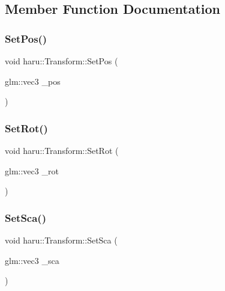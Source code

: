 \subsection{Member Function Documentation}
\mbox{\label{classharu_1_1_transform_a6fd0db91da93d5e88ae6c71559563823}} 
\subsubsection{\texorpdfstring{Set\+Pos()}{SetPos()}}
{\footnotesize\ttfamily void haru\+::\+Transform\+::\+Set\+Pos (\begin{DoxyParamCaption}\item[{glm\+::vec3}]{\+\_\+pos }\end{DoxyParamCaption})}

\mbox{\label{classharu_1_1_transform_a8c27baa1c0c35b0a9bd8e1e60f158262}} 
\subsubsection{\texorpdfstring{Set\+Rot()}{SetRot()}}
{\footnotesize\ttfamily void haru\+::\+Transform\+::\+Set\+Rot (\begin{DoxyParamCaption}\item[{glm\+::vec3}]{\+\_\+rot }\end{DoxyParamCaption})}

\mbox{\label{classharu_1_1_transform_a16f09008ba3b2effca7f1004caa61ef3}} 
\subsubsection{\texorpdfstring{Set\+Sca()}{SetSca()}}
{\footnotesize\ttfamily void haru\+::\+Transform\+::\+Set\+Sca (\begin{DoxyParamCaption}\item[{glm\+::vec3}]{\+\_\+sca }\end{DoxyParamCaption})}



